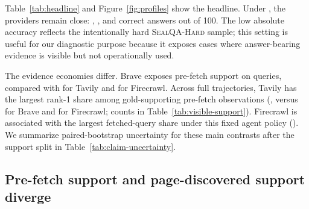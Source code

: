 Table~\ref{tab:headline} and Figure~\ref{fig:profiles} show the headline. Under \correctans{}, the providers remain close: \BraveCorrect{}, \TavilyCorrect{}, and \FirecrawlCorrect{} correct answers out of 100. The low absolute accuracy reflects the intentionally hard \textsc{SealQA-Hard} sample; this setting is useful for our diagnostic purpose because it exposes cases where answer-bearing evidence is visible but not operationally used.

The evidence economies differ. Brave exposes pre-fetch support on \BravePreFetchSupportQ{} queries, compared with \TavilyPreFetchSupportQ{} for Tavily and \FirecrawlPreFetchSupportQ{} for Firecrawl. Across full trajectories, Tavily has the largest rank-1 share among gold-supporting pre-fetch observations (\TavilyRankOnePct{}, versus \BraveRankOnePct{} for Brave and \FirecrawlRankOnePct{} for Firecrawl; counts in Table~\ref{tab:visible-support}). Firecrawl is associated with the largest fetched-query share under this fixed agent policy (\FirecrawlFetchedPct{}). We summarize paired-bootstrap uncertainty for these main contrasts after the support split in Table~\ref{tab:claim-uncertainty}.

\subsection{Pre-fetch support and page-discovered support diverge}

